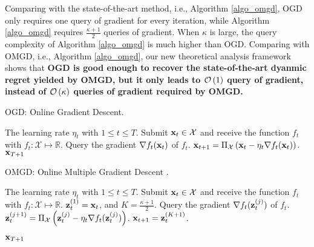 \documentclass[journal]{IEEEtran}
\begin{document}
Comparing with the state-of-the-art method, i.e., Algorithm \ref{algo_omgd}, OGD only requires one query of gradient for every iteration, while Algorithm \ref{algo_omgd} requires $\frac{\kappa + 1}{2}$ queries of gradient. When $\kappa$ is large, the query complexity of Algorithm \ref{algo_omgd} is much higher than OGD. Comparing with OMGD, i.e., Algorithm \ref{algo_omgd}, our new theoretical analysis framework shows that \textbf{OGD is good enough to recover the state-of-the-art dyanmic regret yielded by OMGD, but it only leads to ${\mathcal{O}}\left( 1 \right)$ query of gradient, instead of ${\mathcal{O}}\left( \kappa \right)$ queries of gradient required by OMGD.}




\begin{algorithm}[!t]
   \caption{OGD: Online Gradient Descent.}
   \label{algo_ogd}
   \begin{algorithmic}[1]
   \Require The learning rate $\eta_t$ with $1\le t\le T$.
           \State Submit ${\bf x}_t\in{\mathcal{X}}$ and receive the function $f_t$ with $f_t: \mathcal{X}\mapsto \mathbb{R}$.
            \State Query the gradient $\nabla f_t({\bf x}_t)$ of $f_t$.  
           \State ${\bf x}_{t+1} = \Pi_{{\mathcal{X}}}\left(  {\bf x}_t - \eta_t \nabla f_t({\bf x}_t)  \right)$. 
       \EndFor
       \Return ${\bf x}_{T+1}$
   \end{algorithmic}
\end{algorithm}


\begin{algorithm}[!t]
   \caption{OMGD: Online Multiple Gradient Descent \cite{Zhang:2016wl}. }
   \label{algo_omgd}
   \begin{algorithmic}[1]
   \Require The learning rate $\eta_t$ with $1\le t\le T$.
           \State Submit ${\bf x}_t\in{\mathcal{X}}$ and receive the function $f_t$ with $f_t: \mathcal{X}\mapsto \mathbb{R}$.
           \State ${\bf z}_t^{(1)} = {\bf x}_t$, and $K = \frac{\kappa + 1}{2}$.
            \State Query the gradient $\nabla f_t({\bf z}_t^{(j)})$ of $f_t$.  
           \State ${\bf z}_t^{(j+1)} = \Pi_{{\mathcal{X}}}\left(  {\bf z}_t^{(j)} - \eta_t \nabla f_t({\bf z}_t^{(j)})  \right)$. 
           \EndFor
           \State ${\bf x}_{t+1} = {\bf z}_t^{(K+1)}$.
       \EndFor
       
       \Return ${\bf x}_{T+1}$
   \end{algorithmic}
\end{algorithm}
\end{document}
